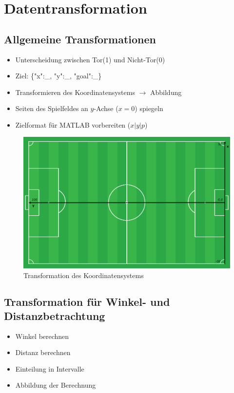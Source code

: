 \section{Datentransformation}
\label{dt}

\subsection{Allgemeine Transformationen}

\begin{itemize}
\item Unterscheidung zwischen Tor(1) und Nicht-Tor(0)
\item Ziel: \{"x":\_, "y":\_, "goal":\_\}
\item Transformieren des Koordinatensystems $\rightarrow$ Abbildung
\item Seiten des Spielfeldes an $y$-Achse ($x=0$) spiegeln 
\item Zielformat für MATLAB vorbereiten ($x|y|p$)
\end{itemize}

\begin{figure}[H]
\centering
\includegraphics[scale=0.28]{se-wa-jpg/transf_pitch}
\caption[Transformation des Koordinatensystems]{Transformation des Koordinatensystems}
\label{transf_pitch}
\end{figure}


\subsection{Transformation für Winkel- und Distanzbetrachtung}

\begin{itemize}
\item Winkel berechnen
\item Distanz berechnen
\item Einteilung in Intervalle
\item Abbildung der Berechnung
\end{itemize}

